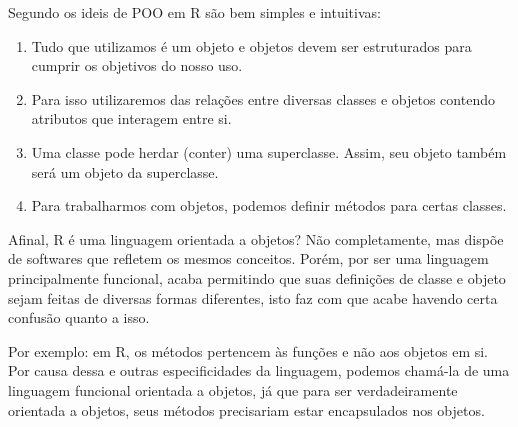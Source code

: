         Segundo \cite{Chambers2014} os ideis de POO em R são bem simples e intuitivas:
        \begin{enumerate}
          \item Tudo que utilizamos é um objeto e objetos devem ser estruturados para cumprir os objetivos do nosso uso.
          \item Para isso utilizaremos das relações entre diversas classes e objetos contendo atributos que interagem entre si.
          \item Uma classe pode herdar (conter) uma superclasse. Assim, seu objeto também será um objeto da superclasse.
          \item Para trabalharmos com objetos, podemos definir métodos para certas classes.
        \end{enumerate}

        Afinal, R é uma linguagem orientada a objetos? Não completamente, mas dispõe de softwares que refletem os mesmos conceitos.
        Porém, por ser uma linguagem principalmente funcional, acaba permitindo que suas definições de classe e objeto sejam feitas de diversas formas diferentes, isto faz com que acabe havendo certa confusão quanto a isso.

        Por exemplo: em R, os métodos pertencem às funções e não aos objetos em si. Por causa dessa e outras especificidades da linguagem, podemos chamá-la de uma linguagem funcional orientada a objetos, já que para ser verdadeiramente orientada a objetos, seus métodos precisariam estar encapsulados nos objetos.

